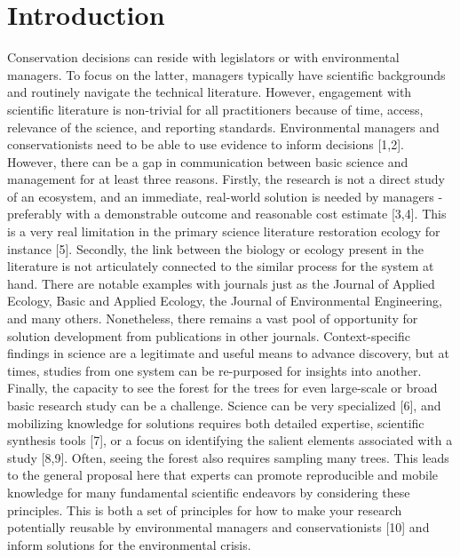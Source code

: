 \documentclass[10pt,letterpaper]{article}
\begin{document}
\linenumbers

\section{Introduction}\label{introduction}

Conservation decisions can reside with legislators or with environmental
managers. To focus on the latter, managers typically have scientific
backgrounds and routinely navigate the technical literature. However,
engagement with scientific literature is non-trivial for all
practitioners because of time, access, relevance of the science, and
reporting standards. Environmental managers and conservationists need to
be able to use evidence to inform decisions {[}1,2{]}. However, there
can be a gap in communication between basic science and management for
at least three reasons. Firstly, the research is not a direct study of
an ecosystem, and an immediate, real-world solution is needed by
managers - preferably with a demonstrable outcome and reasonable cost
estimate {[}3,4{]}. This is a very real limitation in the primary
science literature restoration ecology for instance {[}5{]}. Secondly,
the link between the biology or ecology present in the literature is not
articulately connected to the similar process for the system at hand.
There are notable examples with journals just as the Journal of Applied
Ecology, Basic and Applied Ecology, the Journal of Environmental
Engineering, and many others. Nonetheless, there remains a vast pool of
opportunity for solution development from publications in other
journals. Context-specific findings in science are a legitimate and
useful means to advance discovery, but at times, studies from one system
can be re-purposed for insights into another. Finally, the capacity to
see the forest for the trees for even large-scale or broad basic
research study can be a challenge. Science can be very specialized
{[}6{]}, and mobilizing knowledge for solutions requires both detailed
expertise, scientific synthesis tools {[}7{]}, or a focus on identifying
the salient elements associated with a study {[}8,9{]}. Often, seeing
the forest also requires sampling many trees. This leads to the general
proposal here that experts can promote reproducible and mobile knowledge
for many fundamental scientific endeavors by considering these
principles. This is both a set of principles for how to make your
research potentially reusable by environmental managers and
conservationists {[}10{]} and inform solutions for the environmental
crisis.
\end{document}
